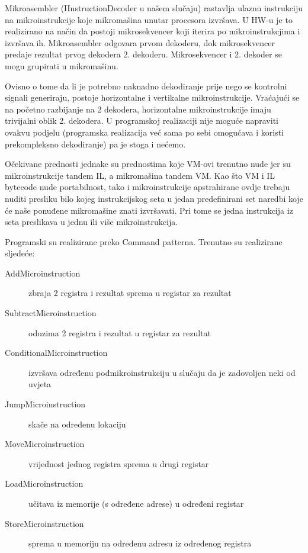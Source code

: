\documentclass[a4paper]{article}
\begin{document}
  Mikroasembler (IInstructionDecoder u našem slučaju) rastavlja ulaznu
  instrukciju na mikroinstrukcije koje mikromašina unutar procesora
  izvršava. U HW-u je to realizirano na način da postoji
  mikrosekvencer koji iterira po mikroinstrukcjima i izvršava
  ih. Mikroasembler odgovara prvom dekoderu, dok mikrosekvencer predaje
  rezultat prvog dekodera 2. dekoderu. Mikrosekvencer i 2. dekoder se
  mogu grupirati u mikromašinu.

  Ovisno o tome da li je potrebno naknadno dekodiranje prije nego
  se kontrolni signali generiraju, postoje horizontalne i vertikalne
  mikroinstrukcije. Vraćajući se na početno razbijanje na 2 dekodera,
  horizontalne mikroinstrukcije imaju trivijalni oblik 2. dekodera.  U
  programskoj realizaciji nije moguće napraviti ovakvu podjelu
  (programska realizacija već sama po sebi omogućava i koristi
  prekompleksno dekodiranje) pa je stoga i nećemo.

  Očekivane prednosti jednake su prednostima koje VM-ovi
  trenutno nude jer su mikroinstrukcije tandem IL, a mikromašina
  tandem VM. 
  Kao što VM i IL bytecode nude portabilnost, tako i
  mikroinstrukcije apstrahirane ovdje trebaju nuditi presliku bilo
  kojeg instrukcijskog seta u jedan predefinirani set naredbi koje će
  naše ponuđene mikromašine znati izvršavati. Pri tome se jedna
  instrukcija iz seta preslikava u jednu ili više
  mikroinstrukcija.

  Programski su realizirane preko Command patterna.  Trenutno su
  realizirane sljedeće:
  \begin{description}
    \item[AddMicroinstruction] zbraja 2 registra i rezultat sprema u
      registar za rezultat
    \item[SubtractMicroinstruction] oduzima 2 registra i rezultat u
      registar za rezultat
    \item[ConditionalMicroinstruction] izvršava određenu
      podmikroinstrukciju u slučaju da je zadovoljen neki od uvjeta
    \item[JumpMicroinstruction] skače na određenu lokaciju
    \item[MoveMicroinstruction] vrijednost jednog registra sprema u
      drugi registar
    \item[LoadMicroinstruction] učitava iz memorije (s određene
      adrese) u određeni registar
    \item[StoreMicroinstruction] sprema u memoriju na određenu adresu
      iz određenog registra
  \end{description}
\end{document}
